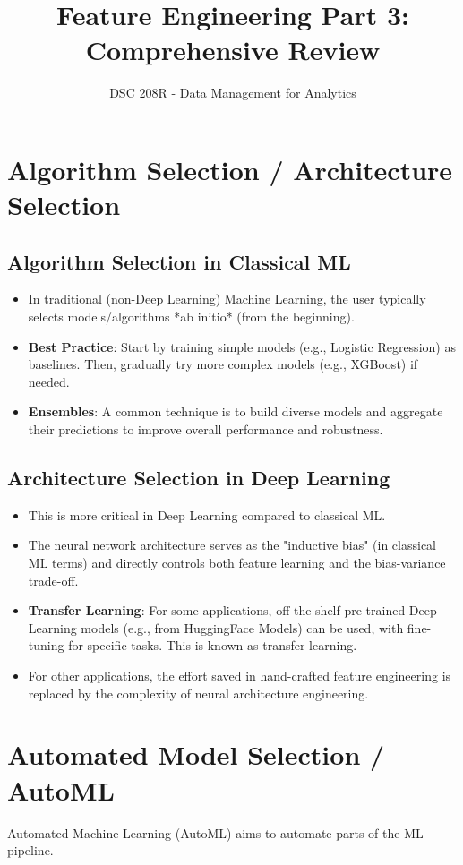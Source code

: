 \documentclass{article}
\title{Feature Engineering Part 3: Comprehensive Review}
\author{DSC 208R - Data Management for Analytics}
\date{}
\begin{document}
\maketitle

\section*{Algorithm Selection / Architecture Selection}

\subsection*{Algorithm Selection in Classical ML}
\begin{itemize}
    \item In traditional (non-Deep Learning) Machine Learning, the user typically selects models/algorithms *ab initio* (from the beginning).
    \item \textbf{Best Practice}: Start by training simple models (e.g., Logistic Regression) as baselines. Then, gradually try more complex models (e.g., XGBoost) if needed.
    \item \textbf{Ensembles}: A common technique is to build diverse models and aggregate their predictions to improve overall performance and robustness.
\end{itemize}

\subsection*{Architecture Selection in Deep Learning}
\begin{itemize}
    \item This is more critical in Deep Learning compared to classical ML.
    \item The neural network architecture serves as the "inductive bias" (in classical ML terms) and directly controls both feature learning and the bias-variance trade-off.
    \item \textbf{Transfer Learning}: For some applications, off-the-shelf pre-trained Deep Learning models (e.g., from HuggingFace Models) can be used, with fine-tuning for specific tasks. This is known as transfer learning.
    \item For other applications, the effort saved in hand-crafted feature engineering is replaced by the complexity of neural architecture engineering.
\end{itemize}

\section*{Automated Model Selection / AutoML}
Automated Machine Learning (AutoML) aims to automate parts of the ML pipeline.
\end{document}
